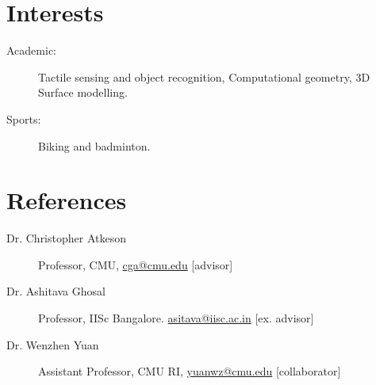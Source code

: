 \documentclass[letterpaper,11pt]{article}
\begin{document}
\section{Interests}
\begin{description}
\item[Academic:] Tactile sensing and object recognition, Computational geometry, 3D Surface modelling.
\vspace{-0.1 in}
\item[Sports:] Biking and badminton.
\end{description}



\section{References}
\begin{description}
\item[Dr. Christopher Atkeson] Professor, CMU, \href{mailto:cga@cmu.edu}{cga@cmu.edu} [advisor]
\vspace{-0.1 in}
\item[Dr. Ashitava Ghosal] Professor, IISc Bangalore.  \href{mailto:asitava@iisc.ac.in}{asitava@iisc.ac.in} [ex. advisor]
\vspace{-0.1 in}
\item[Dr. Wenzhen Yuan] Assistant Professor, CMU RI, \href{mailto:yuanwz@cmu.edu}{yuanwz@cmu.edu} [collaborator]
\end{description}

\end{document}
